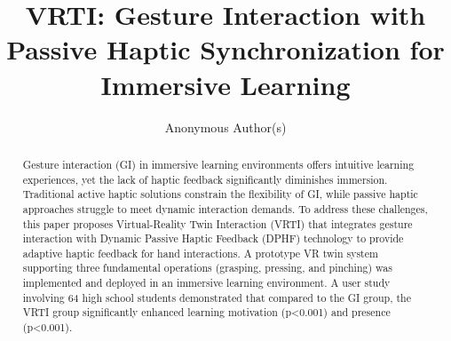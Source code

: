 \documentclass[runningheads]{llncs}
\begin{document}
\title{VRTI: Gesture Interaction with Passive Haptic Synchronization for Immersive Learning}

 


\author{Anonymous Author(s)}

\maketitle

\begin{abstract}
Gesture interaction (GI) in immersive learning environments offers intuitive learning experiences, yet the lack of haptic feedback significantly diminishes immersion. Traditional active haptic solutions constrain the flexibility of GI, while passive haptic approaches struggle to meet dynamic interaction demands. To address these challenges, this paper proposes Virtual-Reality Twin Interaction (VRTI) that integrates gesture interaction with Dynamic Passive Haptic Feedback (DPHF) technology to provide adaptive haptic feedback for hand interactions. 
A prototype VR twin system supporting three fundamental operations (grasping, pressing, and pinching) was implemented and deployed in an immersive learning environment. A user study involving 64 high school students demonstrated that compared to the GI group, the VRTI group significantly enhanced learning motivation (p<0.001) and presence (p<0.001).

\end{abstract}
\end{document}
